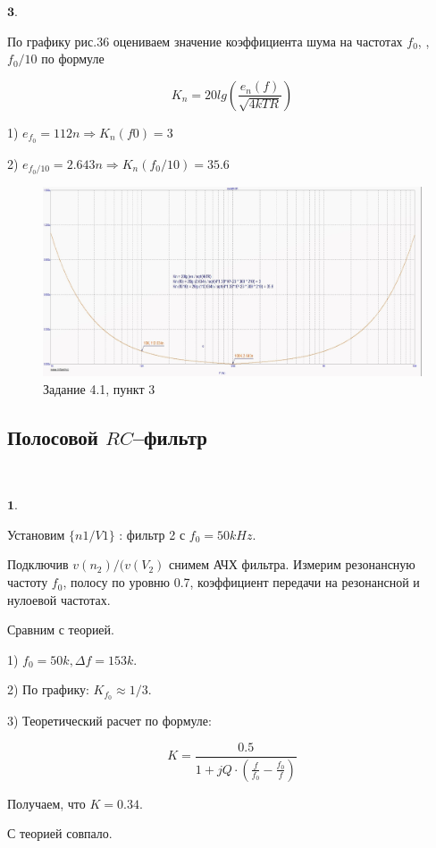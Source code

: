 \documentclass[a4paper, 14pt]{extarticle}%
\begin{document}
$\textbf{3.} $




По графику рис.36 оцениваем значение коэффициента шума на частотах $f_0$, \:, \: $f_0/10$ по формуле


\[  K_n = 20lg(\frac{e_n(f)}{\sqrt{4kTR}})   \]


1) $e_{f_0}= 112n \Rightarrow K_n(f0) = 3$

2) $e_{f_0/10}= 2.643n \Rightarrow K_n(f_0/10) = 35.6 $



\begin{figure}[h!]
			\centering
			\includegraphics[width=1.1\linewidth]{4/4_1_1.jpg}
			\caption{Задание 4.1, пункт 3}
			\label{A}
\end{figure}

\subsection{Полосовой $RC$--фильтр}

$ $

$\textbf{1.} $


Установим $\{n1/V1\}$ : фильтр 2 с $f_0 = 50kHz$.


Подключив $v(n_2)/(v(V_2)$ снимем АЧХ фильтра. Измерим резонансную частоту $f_0$, полосу по уровню 0.7, коэффициент передачи на резонансной и нулоевой частотах.

Сравним с теорией.

1) $f_0 = 50k, \Delta f = 153k$.

2) По графику: $K_{f_0} \approx 1/3$.

3) Теоретический расчет по формуле:

\[ K = \frac{0.5}{1 + jQ\cdot(\frac{f}{f_0} - \frac{f_0}{f})}\]

Получаем, что $K = 0.34$.

С теорией совпало.
\end{document}
